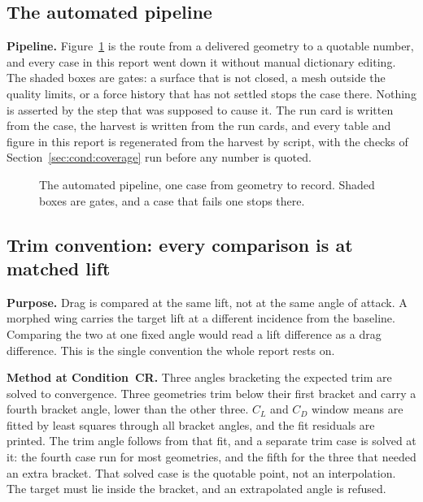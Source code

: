 \subsection{The automated pipeline}
\label{sec:setup:pipeline}

\textbf{Pipeline.} Figure~\ref{fig:pipeline} is the route from a delivered geometry to a quotable
number, and every case in this report went down it without manual dictionary editing. The shaded
boxes are gates: a surface that is not closed, a mesh outside the quality limits, or a force
history that has not settled stops the case there. Nothing is asserted by the step that was
supposed to cause it. The run card is written from the case, the harvest is written from the run
cards, and every table and figure in this report is regenerated from the harvest by script, with
the checks of Section~\ref{sec:cond:coverage} run before any number is quoted.

\begin{figure}[htbp]
  \centering
  \resizebox{\linewidth}{!}{}
  \caption{The automated pipeline, one case from geometry to record. Shaded boxes are gates, and
  a case that fails one stops there.}
  \label{fig:pipeline}
\end{figure}
\subsection{Trim convention: every comparison is at matched lift}
\label{sec:cond:trim}
\textbf{Purpose.} Drag is compared at the same lift, not at the same angle of attack. A morphed
wing carries the target lift at a different incidence from the baseline. Comparing the two at one
fixed angle would read a lift difference as a drag difference. This is the single convention the
whole report rests on.

\textbf{Method at Condition~CR.} Three angles bracketing the expected trim are solved to convergence. Three
geometries trim below their first bracket and carry a fourth bracket angle, lower than the other
three. $C_L$ and $C_D$ window means are fitted by least squares through all bracket angles, and
the fit residuals are printed. The trim angle follows from that fit, and a separate trim case is
solved at it: the fourth case run for most geometries, and the fifth for the three that needed an
extra bracket. That solved case is the quotable point, not an interpolation. The target must lie inside the bracket, and an extrapolated
angle is refused.

